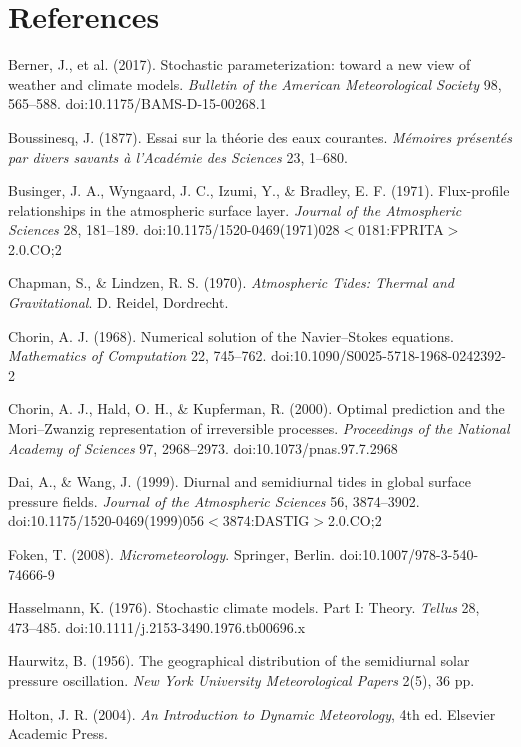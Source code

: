 \documentclass[aps,prfluids,preprint,superscriptaddress,nofootinbib]{revtex4-2}
\begin{document}
\begingroup\sloppy
\section*{References}

Berner, J., et al. (2017). Stochastic parameterization: toward a new view of weather and climate models. \emph{Bulletin of the American Meteorological Society} 98, 565--588. doi:10.1175/BAMS-D-15-00268.1

Boussinesq, J. (1877). Essai sur la th\'eorie des eaux courantes. \emph{M\'emoires pr\'esent\'es par divers savants \`a l'Acad\'emie des Sciences} 23, 1--680.

Businger, J. A., Wyngaard, J. C., Izumi, Y., \& Bradley, E. F. (1971). Flux-profile relationships in the atmospheric surface layer. \emph{Journal of the Atmospheric Sciences} 28, 181--189. doi:10.1175/\hspace{0pt}1520-0469(1971)028$<$0181:FPRITA$>$2.0.CO;2

Chapman, S., \& Lindzen, R. S. (1970). \emph{Atmospheric Tides: Thermal and Gravitational}. D. Reidel, Dordrecht.

Chorin, A. J. (1968). Numerical solution of the Navier--Stokes equations. \emph{Mathematics of Computation} 22, 745--762. doi:10.1090/S0025-5718-1968-0242392-2

Chorin, A. J., Hald, O. H., \& Kupferman, R. (2000). Optimal prediction and the Mori--Zwanzig representation of irreversible processes. \emph{Proceedings of the National Academy of Sciences} 97, 2968--2973. doi:10.1073/pnas.97.7.2968

Dai, A., \& Wang, J. (1999). Diurnal and semidiurnal tides in global surface pressure fields. \emph{Journal of the Atmospheric Sciences} 56, 3874--3902. doi:10.1175/\hspace{0pt}1520-0469(1999)056$<$3874:DASTIG$>$2.0.CO;2

Foken, T. (2008). \emph{Micrometeorology}. Springer, Berlin. doi:10.1007/\hspace{0pt}978-3-540-74666-9

Hasselmann, K. (1976). Stochastic climate models. Part I: Theory. \emph{Tellus} 28, 473--485. doi:10.1111/\hspace{0pt}j.2153-3490.1976.tb00696.x

Haurwitz, B. (1956). The geographical distribution of the semidiurnal solar pressure oscillation. \emph{New York University Meteorological Papers} 2(5), 36 pp.

Holton, J. R. (2004). \emph{An Introduction to Dynamic Meteorology}, 4th ed. Elsevier Academic Press.
\end{document}
